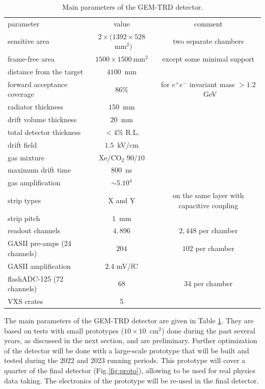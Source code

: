 \documentclass[%
preprint,
nofootinbib,
 amsmath,amssymb,
 aps,
floatfix,
]{revtex4-1}
\begin{document}
\begin{table}[hp]
\begin{ruledtabular}
\begin{tabular}{lcc}
\textrm{parameter}&
\textrm{value}&
\textrm{comment}\\
\colrule
sensitive area & $2 \times (1392 \times 528$~mm$^2)$ & two separate chambers\\
frame-free area & $1500 \times 1500~$mm$^2$ & except some minimal support \\
distance from the target & $4100$~mm & \\
forward acceptance coverage & $86$\% & for $e^+e^-$ invariant mass $>1.2$~GeV \\
radiator thickness & $150$~mm & \\
drift volume thickness & $20$~mm & \\
total detector thickness & $<4$\% R.L. & \\
drift field & $1.5$~kV/cm & \\
gas mixture & Xe/CO$_2$ $90/10$ & \\
maximum drift time & $800$~ns & \\
gas amplification & $\sim 5.10^4$ & \\
strip types & X and Y & on the same layer with capacitive coupling \\
strip pitch & $1$~mm & \\
readout channels & $4,896$ & $2,448$ per chamber \\
GASII pre-amps (24 channels) & $204$ & $102$ per chamber \\
GASII amplification & $2.4$ mV/fC & \\
flashADC-125 (72 channels) & $68$ & $34$ per chamber \\ 
VXS crates & 5 & \\
\end{tabular}
\end{ruledtabular}
\caption{
Main parameters of the GEM-TRD detector.
\label{tab:tech}
}
\end{table}
The main parameters of the GEM-TRD detector are given in Table \ref{tab:tech}.
They are based on tests with small prototypes ($10\times10$~cm$^2$)
done during the past several years, as discussed in the next section,
and are preliminary.
Further optimization of the detector will be done with a large-scale prototype
that will be built and tested during the 2022 and 2023 running periods.
This prototype will cover a quarter of the final detector (Fig.\ref{fig:proto}),
allowing to be used for real physics data taking.
The electronics of the prototype will be re-used in the final detector.
\end{document}
